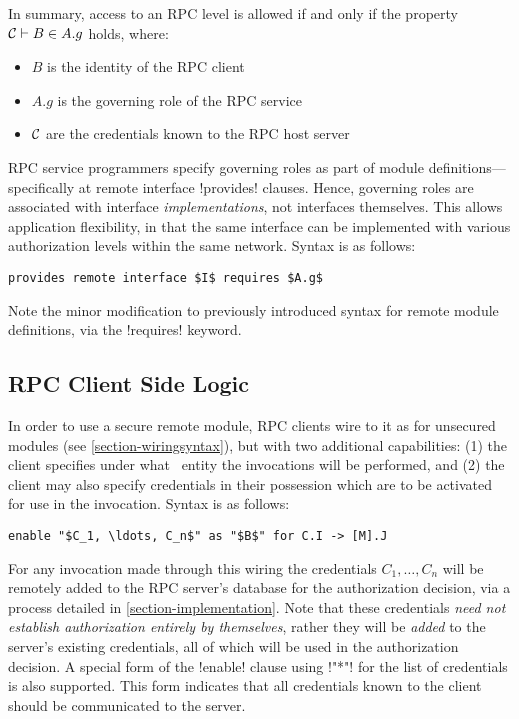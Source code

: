 In summary, access to an RPC level is allowed if and only if the property $\mathcal{C} \vdash B \in
A.g$ holds, where:
\begin{itemize}
  \item $B$ is the identity of the RPC client
  \item $A.g$ is the governing role of the RPC service
  \item $\mathcal{C}$ are the credentials known to the RPC host server
\end{itemize}
RPC service programmers specify governing roles as part of module definitions---specifically at
remote interface !provides! clauses. Hence, governing roles are associated with interface
\emph{implementations}, not interfaces themselves. This allows application flexibility, in that
the same interface can be implemented with various authorization levels within the same network.
Syntax is as follows:
\begin{lstlisting}[mathescape=true]
provides remote interface $I$ requires $A.g$
\end{lstlisting}

Note the minor modification to previously introduced syntax for remote module definitions, via
the !requires! keyword.

\subsection{RPC Client Side Logic}
\label{section-rpc-client-side}

In order to use a secure remote module, RPC clients wire to it as for unsecured modules (see
\autoref{section-wiringsyntax}), but with two additional capabilities: (1) the client specifies
under what \RT\ entity the invocations will be performed, and (2) the client may also specify
credentials in their possession which are to be activated for use in the invocation. Syntax is
as follows:
\begin{lstlisting}[mathescape=true]
enable "$C_1, \ldots, C_n$" as "$B$" for C.I -> [M].J
\end{lstlisting}
For any invocation made through this wiring the credentials $C_1, \ldots, C_n$ will be remotely
added to the RPC server's database for the authorization decision, via a process detailed in
\autoref{section-implementation}. Note that these credentials \emph{need not establish
  authorization entirely by themselves}, rather they will be \emph{added} to the server's
existing credentials, all of which will be used in the authorization decision. A special form of
the !enable! clause using !"*"! for the list of credentials is also supported. This form
indicates that all credentials known to the client should be communicated to the server.

